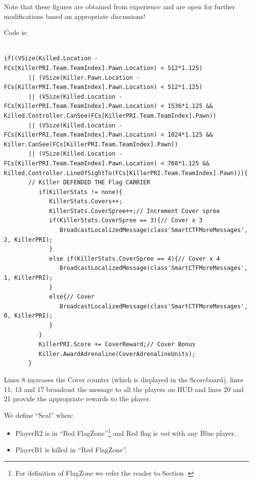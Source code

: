 \documentclass{article}
\begin{document}
Note that these figures are obtained from experience and are open for further modifications based on appropriate discussions!



Code is: 
\begin{lstlisting}[frame=single]  % Start your code-block

if((VSize(Killed.Location - FCs[KillerPRI.Team.TeamIndex].Pawn.Location) < 512*1.125)
       || (VSize(Killer.Pawn.Location - FCs[KillerPRI.Team.TeamIndex].Pawn.Location) < 512*1.125)
       || (VSize(Killed.Location - FCs[KillerPRI.Team.TeamIndex].Pawn.Location) < 1536*1.125 && Killed.Controller.CanSee(FCs[KillerPRI.Team.TeamIndex].Pawn))
       || (VSize(Killed.Location - FCs[KillerPRI.Team.TeamIndex].Pawn.Location) < 1024*1.125 && Killer.CanSee(FCs[KillerPRI.Team.TeamIndex].Pawn))
       || (VSize(Killed.Location - FCs[KillerPRI.Team.TeamIndex].Pawn.Location) < 768*1.125 && Killed.Controller.LineOfSightTo(FCs[KillerPRI.Team.TeamIndex].Pawn))){
       // Killer DEFENDED THE Flag CARRIER
          if(KillerStats != none){
             KillerStats.Covers++;
             KillerStats.CoverSpree++;// Increment Cover spree
             if(KillerStats.CoverSpree == 3){// Cover x 3
                BroadcastLocalizedMessage(class'SmartCTFMoreMessages', 2, KillerPRI);
             }
             else if(KillerStats.CoverSpree == 4){// Cover x 4
                BroadcastLocalizedMessage(class'SmartCTFMoreMessages', 1, KillerPRI);
             }
             else{// Cover
                BroadcastLocalizedMessage(class'SmartCTFMoreMessages', 0, KillerPRI);
             }
          }
          KillerPRI.Score += CoverReward;// Cover Bonus
          Killer.AwardAdrenaline(CoverAdrenalineUnits);
       }  
\end{lstlisting}
Lines 8 increases the Cover counter (which is displayed in the Scoreboard), lines 11, 13 and 17 broadcast the message to all the players on HUD and lines 20 and 21 provide the appropriate rewards to the player.

We define ``Seal'' when:
\begin{itemize}
\item PlayerR2 is in ``Red FlagZone''\footnote{For definition of FlagZone we refer the reader to Section .} and Red flag is \emph{not} with any Blue player.
\item PlayerB1 is killed in ``Red FlagZone''.
\end{itemize}
\end{document}

